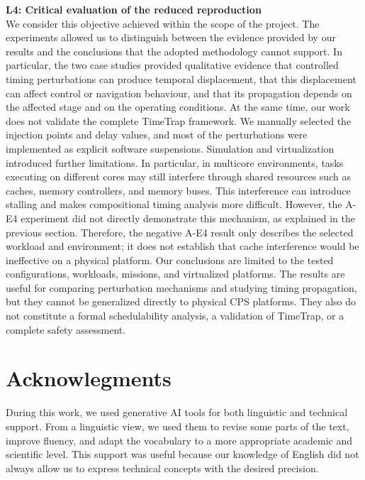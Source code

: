 \noindent\textbf{L4: Critical evaluation of the reduced reproduction} \\ %
We consider this objective achieved within the scope of the project. The experiments allowed us to distinguish between the evidence provided by our results and the conclusions that the adopted methodology cannot support. In particular, the two case studies provided qualitative evidence that controlled timing perturbations can produce temporal displacement, that this displacement can affect control or navigation behaviour, and that its propagation depends on the affected stage and on the operating conditions.
At the same time, our work does not validate the complete TimeTrap framework. We manually selected the injection points and delay values, and most of the perturbations were implemented as explicit software suspensions.
Simulation and virtualization introduced further limitations. 
In particular, in multicore environments, tasks executing on different cores may still interfere through shared resources such as caches, memory controllers, and memory buses. This interference can introduce stalling and makes compositional timing analysis more difficult. However, the A-E4 experiment did not directly demonstrate this mechanism, as explained in the previous section. Therefore, the negative A-E4 result only describes the selected workload and environment; it does not establish that cache interference would be ineffective on a physical platform.
Our conclusions are limited to the tested configurations, workloads, missions, and virtualized platforms. The results are useful for comparing perturbation mechanisms and studying timing propagation, but they cannot be generalized directly to physical CPS platforms. They also do not constitute a formal schedulability analysis, a validation of TimeTrap, or a complete safety assessment.

\section{Acknowlegments}
\noindent During this work, we used generative AI tools for both linguistic and technical support. From a linguistic view, we used them to revise some parts of the text, improve fluency, and adapt the vocabulary to a more appropriate academic and scientific level. This support was useful because our knowledge of English did not always allow us to express technical concepts with the desired precision.

